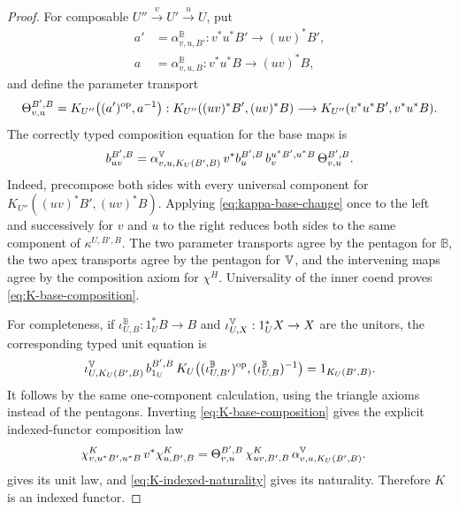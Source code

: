 \begin{proof}
For composable \(U''\xrightarrow{v}U'\xrightarrow{u}U\), put
\[
\begin{split}
 a'&=\alpha^{\mathbb B}_{v,u,B'}:
      v^*u^*B'\longrightarrow(uv)^*B',\\
 a&=\alpha^{\mathbb B}_{v,u,B}:
      v^*u^*B\longrightarrow(uv)^*B,
\end{split}
\]
and define the parameter transport
\begin{equation}
 \Theta_{v,u}^{B',B}
 =
 K_{U''}\bigl((a')^{\mathrm{op}},a^{-1}\bigr):
 K_{U''}((uv)^*B',(uv)^*B)
 \longrightarrow
 K_{U''}(v^*u^*B',v^*u^*B).
 \label{eq:K-parameter-transport}
\end{equation}
The correctly typed composition equation for the base maps is
\begin{equation}
 b_{uv}^{B',B}
 =
 \alpha^{\mathbb{V}}_{v,u,K_U(B',B)}\,
 v^*b_u^{B',B}\,
 b_v^{u^*B',u^*B}\,
 \Theta_{v,u}^{B',B}.
 \label{eq:K-base-composition}
\end{equation}
Indeed, precompose both sides with every universal component for
\(K_{U''}((uv)^*B',(uv)^*B)\).  Applying
\cref{eq:kappa-base-change} once to the left and successively for \(v\) and
\(u\) to the right reduces both sides to the same component of
\(\kappa^{U,B',B}\).  The two parameter transports agree by the pentagon
for \(\mathbb B\), the two apex transports agree by the pentagon for
\(\mathbb{V}\), and the intervening maps agree by the composition axiom for
\(\chi^H\).  Universality of the inner coend proves
\cref{eq:K-base-composition}.

For completeness, if
\(\iota^{\mathbb B}_{U,B}:1_U^*B\to B\) and
\(\iota^{\mathbb{V}}_{U,X}:1_U^*X\to X\) are the unitors, the corresponding typed
unit equation is
\begin{equation}
 \iota^{\mathbb{V}}_{U,K_U(B',B)}\,
 b_{1_U}^{B',B}\,
 K_U\bigl((\iota^{\mathbb B}_{U,B'})^{\mathrm{op}},
          (\iota^{\mathbb B}_{U,B})^{-1}\bigr)
 =1_{K_U(B',B)}.
 \label{eq:K-base-unit}
\end{equation}
It follows by the same one-component calculation, using the triangle
axioms instead of the pentagons.  Inverting
\cref{eq:K-base-composition} gives the explicit indexed-functor
composition law
\begin{equation}
\begin{split}
 \chi^K_{v,u^*B',u^*B}\,v^*\chi^K_{u,B',B}
 ={}&
 \Theta_{v,u}^{B',B}\,
 \chi^K_{uv,B',B}\,
 \alpha^{\mathbb{V}}_{v,u,K_U(B',B)}.
\end{split}
\label{eq:K-comparison-composition}
\end{equation}
 gives its unit law, and
\cref{eq:K-indexed-naturality} gives its naturality.  Therefore \(K\) is an
indexed functor.
\end{proof}

